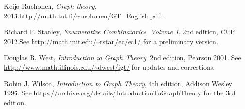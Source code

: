 \documentclass[numbers=enddot,12pt,final,onecolumn,notitlepage]{scrartcl}%
\theoremstyle{definition}
\begin{document}
\begin{thebibliography}{9999999999}
Keijo Ruohonen, \textit{Graph theory},
2013.\newline \url{http://math.tut.fi/~ruohonen/GT_English.pdf} .

Richard P. Stanley, \textit{Enumerative
Combinatorics, Volume 1}, 2nd edition, CUP 2012.\newline See
\url{http://math.mit.edu/~rstan/ec/ec1/} for a preliminary version.

Douglas B. West,
\textit{Introduction to Graph Theory}, 2nd edition, Pearson 2001.
\newline See \url{http://www.math.illinois.edu/~dwest/igt/}
for updates and corrections.

Robin J. Wilson,
\textit{Introduction to Graph Theory}, 4th edition,
Addison Wesley 1996. \newline
See \url{https://archive.org/details/IntroductionToGraphTheory} for
the 3rd edition.

\end{thebibliography}
\end{document}
